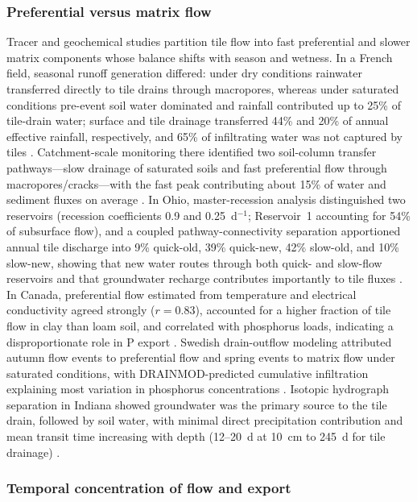 \subsubsection{Preferential versus matrix flow}

Tracer and geochemical studies partition tile flow into fast preferential and slower matrix components whose balance shifts with season and wetness. In a French field, seasonal runoff generation differed: under dry conditions rainwater transferred directly to tile drains through macropores, whereas under saturated conditions pre-event soil water dominated and rainfall contributed up to 25\% of tile-drain water; surface and tile drainage transferred 44\% and 20\% of annual effective rainfall, respectively, and 65\% of infiltrating water was not captured by tiles \parencite{Gaillot2023}. Catchment-scale monitoring there identified two soil-column transfer pathways---slow drainage of saturated soils and fast preferential flow through macropores/cracks---with the fast peak contributing about 15\% of water and sediment fluxes on average \parencite{Grangeon2021}. In Ohio, master-recession analysis distinguished two reservoirs (recession coefficients 0.9 and 0.25~d$^{-1}$; Reservoir~1 accounting for 54\% of subsurface flow), and a coupled pathway-connectivity separation apportioned annual tile discharge into 9\% quick-old, 39\% quick-new, 42\% slow-old, and 10\% slow-new, showing that new water routes through both quick- and slow-flow reservoirs and that groundwater recharge contributes importantly to tile fluxes \parencite{Nazari2021}. In Canada, preferential flow estimated from temperature and electrical conductivity agreed strongly ($r=0.83$), accounted for a higher fraction of tile flow in clay than loam soil, and correlated with phosphorus loads, indicating a disproportionate role in P export \parencite{Pluer2020}. Swedish drain-outflow modeling attributed autumn flow events to preferential flow and spring events to matrix flow under saturated conditions, with DRAINMOD-predicted cumulative infiltration explaining most variation in phosphorus concentrations \parencite{Salazar2011}. Isotopic hydrograph separation in Indiana showed groundwater was the primary source to the tile drain, followed by soil water, with minimal direct precipitation contribution and mean transit time increasing with depth (12--20~d at 10~cm to 245~d for tile drainage) \parencite{Williams2021}.

\subsubsection{Temporal concentration of flow and export}

